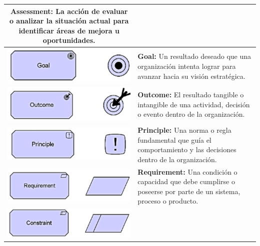 \begin{longtable}{|c|p{8cm}|}
	\textbf{Assessment:} La acción de evaluar o analizar la situación actual para identificar áreas de mejora u oportunidades.                           \\
	\hline
	\includegraphics{anexos/ARCHI/strategy/goal.png}        &
	\textbf{Goal:} Un resultado deseado que una organización intenta lograr para avanzar hacia su visión estratégica.                                    \\
	\hline
	\includegraphics{anexos/ARCHI/strategy/outcome.png}     &
	\textbf{Outcome:} El resultado tangible o intangible de una actividad, decisión o evento dentro de la organización.                                  \\
	\hline
	\includegraphics{anexos/ARCHI/strategy/principle.png}   &
	\textbf{Principle:} Una norma o regla fundamental que guía el comportamiento y las decisiones dentro de la organización.                             \\
	\hline
	\includegraphics{anexos/ARCHI/strategy/requirement.png} &
	\textbf{Requirement:} Una condición o capacidad que debe cumplirse o poseerse por parte de un sistema, proceso o producto.                           \\
	\hline
	\includegraphics{anexos/ARCHI/strategy/constraint.png}  &

\end{longtable}
